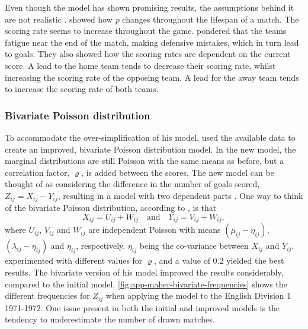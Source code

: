 Even though the model has shown promising results, the assumptions behind it are not realistic \citep{bib:maher-1982}. \citet{bib:dixon-robinson-1998} showed how \textit{p} changes throughout the lifespan of a match. The scoring rate seems to increase throughout the game. \citet{bib:dixon-robinson-1998} pondered that the teams fatigue near the end of the match, making defensive mistakes, which in turn lead to goals. They also showed how the scoring rates are dependent on the current score. A lead to the home team tends to decrease their scoring rate, whilst increasing the scoring rate of the opposing team. A lead for the away team tends to increase the scoring rate of both teams.

\subsubsection{Bivariate Poisson distribution}

To accommodate the over-simplification of his model, \citet{bib:maher-1982} used the available data to create an improved, bivariate Poisson distribution model. In the new model, the marginal distributions are still Poisson with the same means as before, but a correlation factor, $\varrho$, is added between the scores. The new model can be thought of as considering the difference in the number of goals scored, $Z_{ij} = X_{ij} - Y_{ij}$, resulting in a model with two dependent parts \citep{bib:maher-1982}. One way to think of the bivariate Poisson distribution, according to \citet{bib:maher-1982}, is that
\begin{equation*}
    X_{ij} = U_{ij} + W_{ij} \quad \text{and} \quad Y_{ij} = V_{ij} + W_{ij},
\end{equation*}
where $U_{ij}$, $V_{ij}$ and $W_{ij}$ are independent Poisson with means $(\mu_{ij} - \eta_{ij})$, $(\lambda_{ij} - \eta_{ij})$ and $\eta_{ij}$, respectively. $\eta_{ij}$ being the co-variance between $X_{ij}$ and $Y_{ij}$. \citet{bib:maher-1982} experimented with different values for $\varrho$, and a value of $0.2$ yielded the best results. The bivariate version of his model improved the results considerably, compared to the initial model. \cref{fig:app-maher-bivariate-frequencies} shows the different frequencies for $Z_{ij}$ when applying the model to the English Division 1 1971-1972. One issue present in both the initial and improved models is the tendency to underestimate the number of drawn matches.

